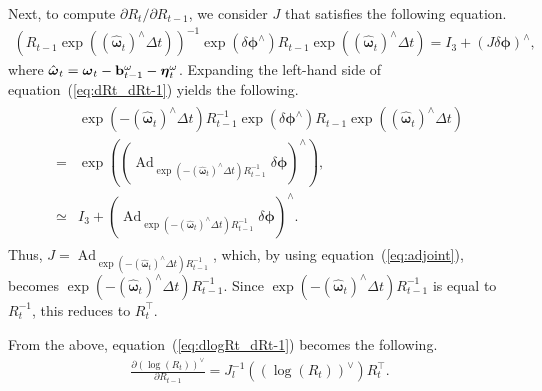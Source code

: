 Next, to compute $\partial R_{t} / \partial R_{t-1}$, we consider $J$ that satisfies the following equation.
%
\begin{align}
  \left( R_{t-1} \exp \left( \left( \hat{ \boldsymbol \omega }_{t} \right)^{\wedge} \Delta t \right) \right)^{-1} \exp \left( \delta \boldsymbol \phi^{\wedge} \right) R_{t-1} \exp \left( \left( \hat{ \boldsymbol \omega }_{t} \right)^{\wedge} \Delta t \right)
  =
  I_{3} + \left( J \delta \boldsymbol \phi \right)^{\wedge},
  \label{eq:dRt_dRt-1}
\end{align}
%
where $\hat{ \boldsymbol \omega }_{t} = \boldsymbol \omega_{t} - {\bf b}_{t-1}^{\omega} - \boldsymbol \eta_{t}^{\omega}$.
Expanding the left-hand side of equation~(\ref{eq:dRt_dRt-1}) yields the following.
%
\begin{align}
  \begin{split}
    & \exp \left( -\left( \hat{ \boldsymbol \omega }_{t} \right)^{\wedge} \Delta t \right) R_{t-1}^{-1} \exp \left( \delta \boldsymbol \phi^{\wedge} \right) R_{t-1} \exp \left( \left( \hat{ \boldsymbol \omega }_{t} \right)^{\wedge} \Delta t \right) \\
    = &
    \exp \left( \left( \operatorname{Ad}_{ \exp \left( -\left( \hat{ \boldsymbol \omega }_{t} \right)^{\wedge} \Delta t \right) R_{t-1}^{-1} } \delta \boldsymbol \phi \right)^{\wedge} \right), \\
    \simeq & I_{3} + \left( \operatorname{Ad}_{ \exp \left( -\left( \hat{ \boldsymbol \omega }_{t} \right)^{\wedge} \Delta t \right) R_{t-1}^{-1} } \delta \boldsymbol \phi \right)^{\wedge}.
  \end{split}
\end{align}
%
Thus, $J = \operatorname{Ad}_{ \exp \left( -\left( \hat{ \boldsymbol \omega }_{t} \right)^{\wedge} \Delta t \right) R_{t-1}^{-1} }$, which, by using equation~(\ref{eq:adjoint}), becomes $\exp \left( -\left( \hat{ \boldsymbol{\omega} }_{t} \right)^{\wedge} \Delta t \right) R_{t-1}^{-1}$.
Since $\exp \left( -\left( \hat{ \boldsymbol{\omega} }_{t} \right)^{\wedge} \Delta t \right) R_{t-1}^{-1}$ is equal to $R_{t}^{-1}$, this reduces to $R_{t}^{\top}$.

From the above, equation~(\ref{eq:dlogRt_dRt-1}) becomes the following.
%
\begin{align}
  \frac{ \partial \left( \log \left( R_{t} \right) \right)^{\vee} }{ \partial R_{t-1} }
  =
  J_{l}^{-1} \left( \left( \log \left( R_{t} \right) \right)^{\vee} \right) R_{t}^{\top}.
\end{align}
%

